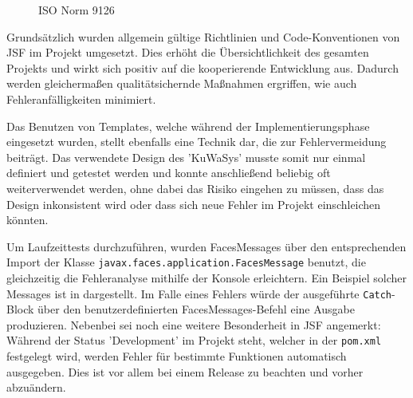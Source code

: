 \begin{figure}[H]
\centering{}
\caption[\textbf{ISO Norm 9126}]{ISO Norm 9126}
\label{fig:Projekt_Mindmap}
\end{figure}

Grundsätzlich wurden allgemein gültige Richtlinien und Code-Konventionen von JSF im Projekt umgesetzt. Dies erhöht die Übersichtlichkeit des gesamten Projekts und wirkt sich positiv auf die kooperierende Entwicklung aus. Dadurch werden gleichermaßen qualitätsichernde Maßnahmen ergriffen, wie auch Fehleranfälligkeiten minimiert.  

Das Benutzen von Templates, welche während der Implementierungsphase eingesetzt wurden, stellt ebenfalls eine Technik dar, die zur Fehlervermeidung beiträgt. Das verwendete Design des 'KuWaSys' musste somit nur einmal definiert und getestet werden und konnte anschließend beliebig oft weiterverwendet werden, ohne dabei das Risiko eingehen zu müssen, dass das Design inkonsistent wird oder dass sich neue Fehler im Projekt einschleichen könnten. 

Um Laufzeittests durchzuführen, wurden FacesMessages über den entsprechenden Import der Klasse \texttt{javax.faces.application.FacesMessage} benutzt, die gleichzeitig die Fehleranalyse mithilfe der Konsole erleichtern.
Ein Beispiel solcher Messages ist in  dargestellt. Im Falle eines Fehlers würde der ausgeführte \texttt{Catch}-Block über den benutzerdefinierten FacesMessages-Befehl eine Ausgabe produzieren.
Nebenbei sei noch eine weitere Besonderheit in JSF angemerkt:
Während der Status 'Development' im  Projekt steht, welcher in der \texttt{pom.xml} festgelegt wird, werden Fehler für bestimmte Funktionen automatisch ausgegeben. Dies ist vor allem bei einem Release zu beachten und vorher abzuändern.

